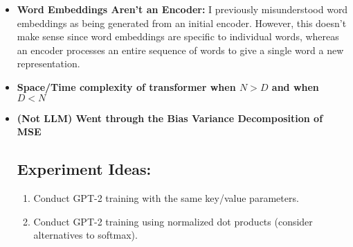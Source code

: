 \documentclass{article}
\begin{document}
\begin{itemize}
\item \textbf{Word Embeddings Aren’t an Encoder:}
I previously misunderstood word embeddings as being generated from an initial encoder. However, this doesn't make sense since word embeddings are specific to individual words, whereas an encoder processes an entire sequence of words to give a single word a new representation.

 \item \textbf{Space/Time complexity of transformer when $N > D$ and when $D < N$}
  \item \textbf{(Not LLM) Went through the Bias Variance Decomposition of MSE}

\subsection*{Experiment Ideas:}
\begin{enumerate}
  \item Conduct GPT-2 training with the same key/value parameters.
  \item Conduct GPT-2 training using normalized dot products (consider alternatives to softmax).
\end{enumerate}

\end{itemize}
\end{document}
